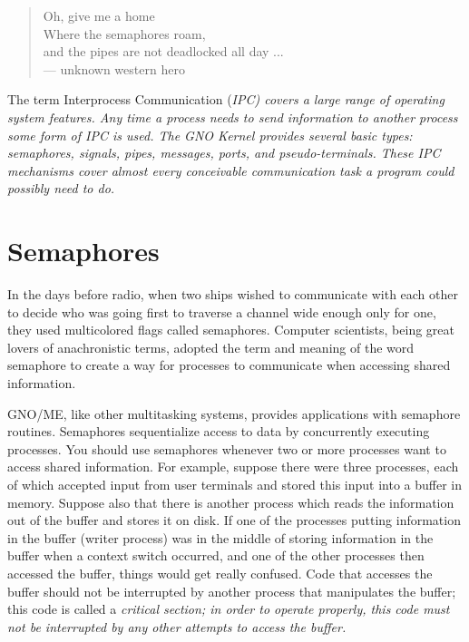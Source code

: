 \documentclass{report}
\begin{document}
\tiny

\begin{verse}
Oh, give me a home \\
Where the semaphores roam, \\
and the pipes are not deadlocked all day ... \\

--- unknown western hero
\end{verse}

\normalsize

The term Interprocess Communication (\it IPC\rm)
covers a large range of operating system features. Any time a
process needs to send information to another process some form of
IPC is used. The GNO Kernel provides several basic types:
semaphores, signals, pipes, messages, ports, and
pseudo-terminals. These IPC mechanisms cover almost every
conceivable communication task a program could possibly need to
do.

\section{Semaphores}

In the days before radio, when two ships
wished to communicate with each other to decide who was going
first to traverse a channel wide enough only for one, they used
multicolored flags called semaphores. Computer scientists, being
great lovers of anachronistic terms, adopted the term and meaning
of the word semaphore to create a way for processes to
communicate when accessing shared information.

GNO/ME, like other multitasking systems,
provides applications with semaphore routines. Semaphores
sequentialize access to data by concurrently executing processes.
You should use semaphores whenever two or more processes want to
access shared information. For example, suppose there were three
processes, each of which accepted input from user terminals and
stored this input into a buffer in memory. Suppose also that
there is another process which reads the information out of the
buffer and stores it on disk. If one of the processes putting
information in the buffer (writer process) was in the middle of
storing information in the buffer when a 
context switch occurred,
and one of the other processes then accessed the buffer, things
would get really confused. Code that accesses the buffer should
not be interrupted by another process that manipulates the
buffer; this code is called a 
\it critical section\rm; in order to operate properly, this code 
must not be interrupted by any other attempts to access the buffer.
\end{document}

